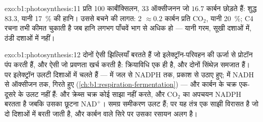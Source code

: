 \begin{solution}{exo:b1:photosynthesis:11}
प्रति 100 कार्बॉक्सिलन, 33 ऑक्सीजनन जो $16.7$ कार्बन छोड़ते हैं: शुद्ध
$83.3$, यानी \qty{17}{\%} की हानि। उससे बचने की लागत: 2  $\approx
0.2$ कार्बन प्रति $\mathrm{CO_2}$, यानी \qty{20}{\%}; C4 रचना तभी
कीमत चुकाती है जब हानि लगभग पाँचवें भाग से अधिक हो --- यानी गरम, सूखी
दशाओं में, ठंडी दशाओं में नहीं।
\end{solution}

\begin{solution}{exo:b1:photosynthesis:12}
दोनों ऐसी झिल्लियाँ बरतते हैं जो इलेक्ट्रॉन-परिवहन की ऊर्जा से प्रोटॉन
पंप करती हैं, और ऐसी  जो प्रवणता खर्च करती है: क्रियाविधि एक ही
है, और दोनों सिंथेज़ समजात हैं। पर इलेक्ट्रॉन उलटी दिशाओं में चलते हैं
---  में जल से NADPH तक, प्रकाश से उठाए हुए;  में NADH से
ऑक्सीजन तक, गिरते हुए
(\cref{ch:b1:respiration-fermentation}) --- और कार्बन के चक्र
एक-दूसरे के उलट नहीं हैं:  और क्रेब्स चक्र कोई  साझा
नहीं करते, और $\mathrm{CO_2}$ का अपचयन NADPH बरतता है जबकि उसका
छूटना $\mathrm{NAD^+}$। समग्र समीकरण उलट हैं; पर
यह तंत्र एक साझी विरासत है जो दो दिशाओं में बरती जाती है, और कार्बन वाले
सिरे पर उसका रसायन अलग है।
\end{solution}

